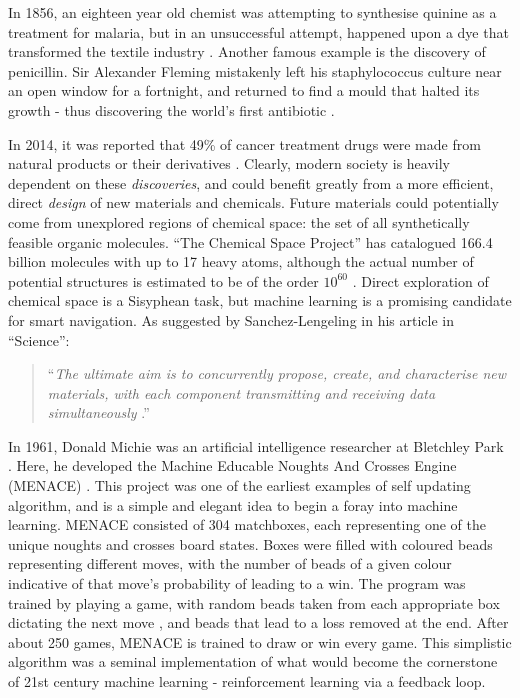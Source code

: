 \documentclass[12pt,a4paper]{article}
\begin{document}
In 1856, an eighteen year old chemist was attempting to synthesise quinine as a treatment for malaria, but in an unsuccessful attempt, happened upon a dye that transformed the textile industry \cite{prisco_color_2017}. Another famous example is the discovery of penicillin. Sir Alexander Fleming mistakenly left his staphylococcus culture near an open window for a fortnight, and returned to find a mould that halted its growth - thus discovering the world's first antibiotic \cite{markel_real_2013}. 

In 2014, it was reported that 49\% of cancer treatment drugs were made from natural products or their derivatives \cite{cragg_natural_2016}. Clearly, modern society is heavily dependent on these \emph{discoveries}, and could benefit greatly from a more efficient, direct \emph{design} of new materials and chemicals. Future materials could potentially come from unexplored regions of chemical space: the set of all synthetically feasible organic molecules. \enquote{The Chemical Space Project} \cite{reymond_chemical_2015} has catalogued 166.4 billion molecules with up to 17 heavy atoms, although the actual number of potential structures is estimated to be of the order $10^{60}$ \cite{virshup_stochastic_2013}. Direct exploration of chemical space is a Sisyphean task, but machine learning is a promising candidate for smart navigation. As suggested by Sanchez-Lengeling in his article in \enquote{Science}:
\begin{quote}
    \enquote{\emph{The ultimate aim is to concurrently propose, create, and characterise new materials, with each component transmitting and receiving data simultaneously} \cite{sanchez-lengeling_inverse_2018}.}
\end{quote}
In 1961, Donald Michie was an artificial intelligence researcher at Bletchley Park \cite{noauthor_obituary_2007}. Here, he developed the Machine Educable Noughts And Crosses Engine (MENACE) \cite{michie_experiments_1963}. This project was one of the earliest examples of self updating algorithm, and is a simple and elegant idea to begin a foray into machine learning. MENACE consisted of 304 matchboxes, each representing one of the unique noughts and crosses board states. Boxes  were filled with coloured beads representing different moves, with the number of beads of a given colour indicative of that move's probability of leading to a win. The program was trained by playing a game, with random beads taken from each appropriate box dictating the next move \cite{michie_experiments_1963}, and beads that lead to a loss removed at the end. After about 250 games, MENACE is trained to draw or win every game. This simplistic algorithm was a seminal implementation of what would become the cornerstone of 21st century machine learning - reinforcement learning via a feedback loop.
\end{document}
